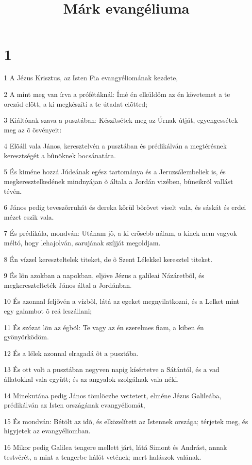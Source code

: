 

\title{Márk evangéliuma}


\chapter{1}

\par 1 A Jézus Krisztus, az Isten Fia evangyéliomának kezdete,
\par 2 A mint meg van írva a prófétáknál: Ímé én elküldöm az én követemet a te orczád elõtt, a ki megkészíti a te útadat elõtted;
\par 3 Kiáltónak szava a pusztában: Készítsétek meg az Úrnak útját, egyengessétek meg az õ ösvényeit:
\par 4 Elõáll vala János, keresztelvén a pusztában és prédikálván a megtérésnek keresztségét a bûnöknek bocsánatára.
\par 5 És kiméne hozzá Júdeának egész tartománya és a Jeruzsálembeliek is, és megkeresztelkedének mindnyájan õ általa a Jordán vizében, bûneikrõl vallást tévén.
\par 6 János pedig teveszõrruhát és dereka körül bõrövet viselt vala, és sáskát és erdei mézet eszik vala.
\par 7 És prédikála, mondván: Utánam jõ, a ki erõsebb nálam, a kinek nem vagyok méltó, hogy lehajolván, sarujának szíjját megoldjam.
\par 8 Én vízzel kereszteltelek titeket, de õ Szent Lélekkel keresztel titeket.
\par 9 És lõn azokban a napokban, eljöve Jézus a galileai Názáretbõl, és megkeresztelteték János által a Jordánban.
\par 10 És azonnal feljõvén a vízbõl, látá az egeket megnyilatkozni, és a Lelket mint egy galambot õ reá leszállani;
\par 11 És szózat lõn az égbõl: Te vagy az én szerelmes fiam, a kiben én gyönyörködöm.
\par 12 És a lélek azonnal elragadá õt a pusztába.
\par 13 És ott volt a pusztában negyven napig kísértetve a Sátántól, és a vad állatokkal vala együtt; és az angyalok szolgálnak vala néki.
\par 14 Minekutána pedig János tömlöczbe vettetett, elméne Jézus Galileába, prédikálván az Isten országának evangyéliomát,
\par 15 És mondván: Bétölt az idõ, és elközelített az Istennek országa; térjetek meg, és higyjetek az evangyéliomban.
\par 16 Mikor pedig Galilea tengere mellett járt, látá Simont és Andrást, annak testvérét, a mint a tengerbe hálót vetének; mert halászok valának.
